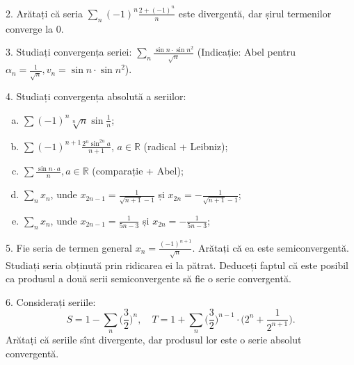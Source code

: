 \documentclass[11pt,a4paper]{article}
\newcommand\RR{\mathbb{R}}
\theoremstyle{dotless}
\theoremstyle{dotlessdr}
\begin{document}
\vspace{1cm}

2. Arătați că seria $\sum_n (-1)^n \frac{2 + (-1)^n}{n}$ este divergentă, dar
șirul termenilor converge la 0.

\vspace{1cm}

3. Studiați convergența seriei: $\sum_n \frac{\sin n \cdot \sin n^2}{\sqrt{n}}$
(Indicație: Abel pentru $\alpha_n = \frac{1}{\sqrt{n}}, v_n = \sin n \cdot \sin n^2$).

\vspace{1cm}

4. Studiați convergența absolută a seriilor:
\begin{enumerate}[(a)]
\item $\sum (-1)^n \sqrt[n]{n} \sin \frac{1}{n}$;
\item $\sum (-1)^{n + 1} \frac{2^n \sin^{2n} a}{n + 1}$, $a \in \RR$ (radical + Leibniz);
\item $\sum \frac{\sin n \cdot a}{n}, a \in \RR$ (comparație + Abel);
\item $\sum_n x_n$, unde $x_{2n - 1} = \frac{1}{\sqrt{n + 1} - 1}$ și $x_{2n} = -\frac{1}{\sqrt{n + 1} - 1}$;
\item $\sum_n x_n$, unde $x_{2n - 1} = \frac{1}{5n - 3}$ și $x_{2n} = -\frac{1}{5n - 3}$;
\end{enumerate}

\vspace{1cm}

5. Fie seria de termen general $x_n = \frac{(-1)^{n+1}}{\sqrt{n}}$. Arătați că ea este
semiconvergentă. Studiați seria obținută prin ridicarea ei la pătrat. Deduceți faptul că
este posibil ca produsul a două serii semiconvergente să fie o serie convergentă.

\vspace{1cm}

6. Considerați seriile:
\[
  S = 1 - \sum_n \Big( \frac{3}{2} \Big)^n, \quad %
  T = 1 + \sum_n \Big( \frac{3}{2} \Big)^{n - 1} \cdot \Big( 2^n + \frac{1}{2^{n + 1}} \Big).
\]
Arătați că seriile sînt divergente, dar produsul lor este o serie absolut convergentă.
\end{document}
